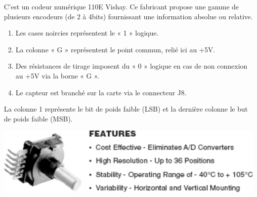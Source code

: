 \documentclass[10pt]{article}
\begin{document}
\begin{minipage}[c]{.7\linewidth}
C’est un codeur numérique 110E Vishay. Ce fabricant propose une gamme de plusieurs encodeurs (de 2 à 4bits) fournissant une information absolue ou relative.

\begin{enumerate}
\item Les cases noircies représentent le « 1 » logique.
\item La colonne « G » représentent le point commun, relié ici au +5V.
\item Des résistances de tirage imposent du « 0 » logique en cas de non connexion au +5V via la borne « G ».
\item Le capteur est branché sur la carte via le connecteur J8.
\end{enumerate}
La colonne 1 représente le bit de poids faible (LSB) et la dernière colonne le but de poids faible (MSB). 

\begin{center}
\includegraphics[width=.95\textwidth]{images/codeur}
\end{center}
\end{minipage} \hfill
\end{document}
